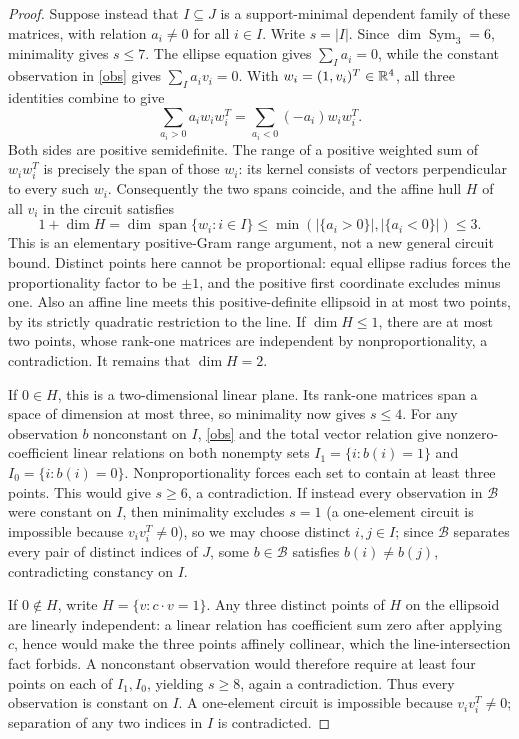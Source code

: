 \begin{proof}
Suppose instead that $I\subseteq J$ is a support-minimal dependent family
of these matrices, with relation $a_i\ne0$ for all $i\in I$.
Write $s=|I|$. Since $\dim\operatorname{Sym}_3=6$, minimality gives $s\le7$.
The ellipse equation gives $\sum_{I}a_i=0$, while the constant observation
in \eqref{obs} gives $\sum_I a_iv_i=0$.
With $w_i=(1,v_i)^T\in\mathbb R^4$, all three identities combine to give
\[
 \sum_{a_i>0}a_iw_iw_i^T=\sum_{a_i<0}(-a_i)w_iw_i^T.
\]
Both sides are positive semidefinite. The range of a positive weighted sum
of $w_iw_i^T$ is precisely the span of those $w_i$:
its kernel consists of vectors perpendicular to every such $w_i$.
Consequently the two spans coincide, and the affine hull $H$ of all $v_i$
in the circuit satisfies
\[
 1+\dim H=\dim\operatorname{span}\{w_i:i\in I\}
 \le\min(|\{a_i>0\}|,|\{a_i<0\}|)\le3.
\]
This is an elementary positive-Gram range argument, not a new general circuit bound.
Distinct points here cannot be proportional: equal ellipse radius forces
the proportionality factor to be $\pm1$, and the positive first coordinate
excludes minus one. Also an affine line meets this positive-definite ellipsoid
in at most two points, by its strictly quadratic restriction to the line.
If $\dim H\le1$, there are at most two points, whose rank-one matrices
are independent by nonproportionality, a contradiction.
It remains that $\dim H=2$.

If $0\in H$, this is a two-dimensional linear plane. Its rank-one matrices
span a space of dimension at most three, so minimality now gives $s\le4$.
For any observation $b$ nonconstant on $I$, \eqref{obs} and the total vector
relation give nonzero-coefficient linear relations on both nonempty sets
$I_1=\{i:b(i)=1\}$ and $I_0=\{i:b(i)=0\}$.
Nonproportionality forces each set to contain at least three points.
This would give $s\ge6$, a contradiction. If instead every observation in
$\mathcal B$ were constant on $I$, then minimality excludes $s=1$ (a
one-element circuit is impossible because $v_iv_i^T\ne0$), so we may choose
distinct $i,j\in I$; since $\mathcal B$ separates every pair of distinct
indices of $J$, some $b\in\mathcal B$ satisfies $b(i)\ne b(j)$,
contradicting constancy on $I$.

If $0\notin H$, write $H=\{v:c\cdot v=1\}$.
Any three distinct points of $H$ on the ellipsoid are linearly independent:
a linear relation has coefficient sum zero after applying $c$, hence would
make the three points affinely collinear, which the line-intersection fact forbids.
A nonconstant observation would therefore require at least four points
on each of $I_1,I_0$, yielding $s\ge8$, again a contradiction.
Thus every observation is constant on $I$. A one-element circuit is impossible
because $v_iv_i^T\ne0$; separation of any two indices in $I$ is contradicted.
\end{proof}

